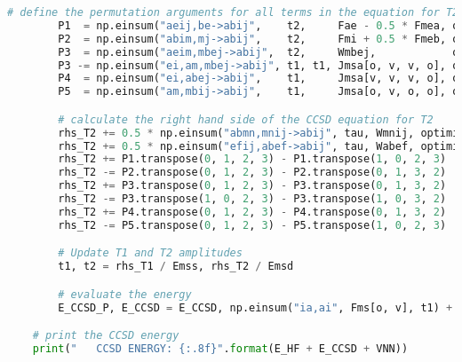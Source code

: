 \begin{lstlisting}[language=Python, caption={\acrshort{ccd} and \acrshort{ccsd} method exercise code solution.}, label=code:cc_solution]
        # define the permutation arguments for all terms in the equation for T2
        P1  = np.einsum("aeij,be->abij",    t2,     Fae - 0.5 * Fmea, optimize=True)
        P2  = np.einsum("abim,mj->abij",    t2,     Fmi + 0.5 * Fmeb, optimize=True)
        P3  = np.einsum("aeim,mbej->abij",  t2,     Wmbej,            optimize=True)
        P3 -= np.einsum("ei,am,mbej->abij", t1, t1, Jmsa[o, v, v, o], optimize=True)
        P4  = np.einsum("ei,abej->abij",    t1,     Jmsa[v, v, v, o], optimize=True)
        P5  = np.einsum("am,mbij->abij",    t1,     Jmsa[o, v, o, o], optimize=True)

        # calculate the right hand side of the CCSD equation for T2
        rhs_T2 += 0.5 * np.einsum("abmn,mnij->abij", tau, Wmnij, optimize=True)
        rhs_T2 += 0.5 * np.einsum("efij,abef->abij", tau, Wabef, optimize=True)
        rhs_T2 += P1.transpose(0, 1, 2, 3) - P1.transpose(1, 0, 2, 3)
        rhs_T2 -= P2.transpose(0, 1, 2, 3) - P2.transpose(0, 1, 3, 2)
        rhs_T2 += P3.transpose(0, 1, 2, 3) - P3.transpose(0, 1, 3, 2)
        rhs_T2 -= P3.transpose(1, 0, 2, 3) - P3.transpose(1, 0, 3, 2)
        rhs_T2 += P4.transpose(0, 1, 2, 3) - P4.transpose(0, 1, 3, 2)
        rhs_T2 -= P5.transpose(0, 1, 2, 3) - P5.transpose(1, 0, 2, 3)

        # Update T1 and T2 amplitudes
        t1, t2 = rhs_T1 / Emss, rhs_T2 / Emsd

        # evaluate the energy
        E_CCSD_P, E_CCSD = E_CCSD, np.einsum("ia,ai", Fms[o, v], t1) + 0.25 * np.einsum("ijab,abij", Jmsa[o, o, v, v], t2) + 0.5 * np.einsum("ijab,ai,bj", Jmsa[o, o, v, v], t1, t1)

    # print the CCSD energy
    print("   CCSD ENERGY: {:.8f}".format(E_HF + E_CCSD + VNN))
\end{lstlisting}
